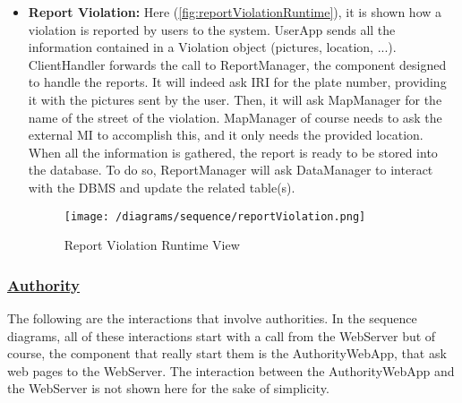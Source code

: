 \begin{itemize}
				\FloatBarrier
				\newpage
			
				\item \textbf{Report Violation:} Here (\autoref{fig:reportViolationRuntime}), it is shown how a violation is reported by users to the system. UserApp sends all the information contained in a Violation object (pictures, location, ...). ClientHandler forwards the call to ReportManager, the component designed to handle the reports. It will indeed ask IRI for the plate number, providing it with the pictures sent by the user. Then, it will ask MapManager for the name of the street of the violation. MapManager of course needs to ask the external MI to accomplish this, and it only needs the provided location. When all the information is gathered, the report is ready to be stored into the database. To do so, ReportManager will ask DataManager to interact with the DBMS and update the related table(s).
				
				\begin{figure}[h!]
					\centering
					\texttt{[image: /diagrams/sequence/reportViolation.png]}
					\caption{\label{fig:reportViolationRuntime} Report Violation Runtime View}
				\end{figure}
			\end{itemize}
		
		\subsubsection[Authority]{\hyperlink{toc}{Authority}}
			\label{sec:authorityRuntimeView}
			
			The following are the interactions that involve authorities. In the sequence diagrams, all of these interactions start with a call from the WebServer but of course, the component that really start them is the AuthorityWebApp, that ask web pages to the WebServer. The interaction between the AuthorityWebApp and the WebServer is not shown here for the sake of simplicity.
			
